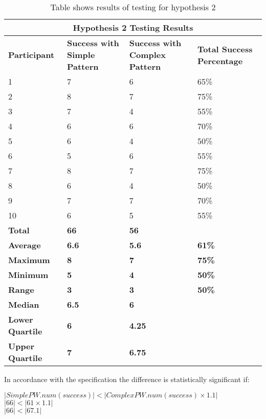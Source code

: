 \documentclass{article}
\begin{document}
{
\begin{table} [H]
\centering
\begin{tabular}{ |p{2cm}|p{4cm}|p{4cm}| p{4cm} | }
\hline
\multicolumn{4}{|c|}{\textbf{Hypothesis 2 Testing Results}} \\
\hline
\textbf{Participant} & \textbf{Success with Simple Pattern} & \textbf{Success with Complex Pattern} & \textbf{Total Success Percentage} \\
\hline
1 & 7 & 6 & 65\% \\
\hline
2 & 8 & 7 & 75\% \\
\hline
3 & 7 & 4 & 55\% \\
\hline
4 & 6 & 6 & 70\%  \\
\hline
5 & 6 & 4 & 50\% \\
\hline
6 & 5 & 6 & 55\% \\
\hline
7 & 8 & 7 & 75\% \\
\hline
8 & 6 & 4 & 50\% \\
\hline
9 & 7 & 7 & 70\% \\
\hline
10 & 6 & 5 & 55\% \\
\hline
\textbf{Total} & \textbf{66} & \textbf{56} & \\
\hline
\textbf{Average} & \textbf{6.6} & \textbf{5.6} & \textbf{61\%} \\
\hline
\textbf{Maximum} & \textbf{8} & \textbf{7} & \textbf{75\%} \\
\hline
\textbf{Minimum} & \textbf{5} & \textbf{4} & \textbf{50\%} \\
\hline
\textbf{Range} & \textbf{3} & \textbf{3} & \textbf{50\%} \\
\hline
\textbf{Median} & \textbf{6.5} & \textbf{6} & \\
\hline
\textbf{Lower Quartile} & \textbf{6} & \textbf{4.25} & \\
\hline
\textbf{Upper Quartile} & \textbf{7} & \textbf{6.75} & \\
\hline
\end{tabular}
\caption{Table shows results of testing for hypothesis 2}
\label{table:2}
\end{table}
}

In accordance with the specification the difference is statistically significant if: 
\begin{center}
    $ |SimplePW.num(success)| < |ComplexPW.num(success) \times 1.1|$ \\
    $ |66| < |61 \times 1.1| $ \\
    $ |66| < |67.1| $
\end{center}
\end{document}

